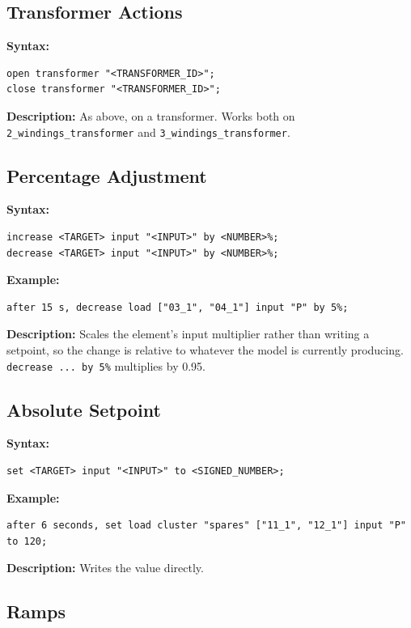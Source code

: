 \documentclass[12pt]{article}
\begin{document}
\subsection{Transformer Actions}

\textbf{Syntax:}
\begin{lstlisting}
open transformer "<TRANSFORMER_ID>";
close transformer "<TRANSFORMER_ID>";
\end{lstlisting}

\textbf{Description:} As above, on a transformer. Works both on \texttt{2\_windings\_transformer} and \texttt{3\_windings\_transformer}.

\subsection{Percentage Adjustment}

\textbf{Syntax:}
\begin{lstlisting}
increase <TARGET> input "<INPUT>" by <NUMBER>%;
decrease <TARGET> input "<INPUT>" by <NUMBER>%;
\end{lstlisting}

\textbf{Example:}
\begin{lstlisting}
after 15 s, decrease load ["03_1", "04_1"] input "P" by 5%;
\end{lstlisting}

\textbf{Description:} Scales the element's input multiplier rather than writing a setpoint, so the change is relative to whatever the model is currently producing. \texttt{decrease ... by 5\%} multiplies by 0.95.

\subsection{Absolute Setpoint}

\textbf{Syntax:}
\begin{lstlisting}
set <TARGET> input "<INPUT>" to <SIGNED_NUMBER>;
\end{lstlisting}

\textbf{Example:}
\begin{lstlisting}
after 6 seconds, set load cluster "spares" ["11_1", "12_1"] input "P" to 120;
\end{lstlisting}

\textbf{Description:} Writes the value directly.

\subsection{Ramps}
\label{sec:ramps}
\end{document}
